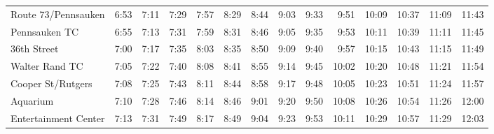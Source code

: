 \begin{center}
\begin{tabular}{@{}lrrrrrrrrrrrrr@{}}
Route 73/Pennsauken & 6:53 & 7:11 & 7:29 & 7:57 & 8:29 & 8:44 & 9:03 & 9:33 & 9:51 & 10:09 & 10:37 & 11:09 & 11:43 \\
Pennsauken TC & 6:55 & 7:13 & 7:31 & 7:59 & 8:31 & 8:46 & 9:05 & 9:35 & 9:53 & 10:11 & 10:39 & 11:11 & 11:45 \\
36th Street & 7:00 & 7:17 & 7:35 & 8:03 & 8:35 & 8:50 & 9:09 & 9:40 & 9:57 & 10:15 & 10:43 & 11:15 & 11:49 \\
Walter Rand TC & 7:05 & 7:22 & 7:40 & 8:08 & 8:41 & 8:55 & 9:14 & 9:45 & 10:02 & 10:20 & 10:48 & 11:21 & 11:54 \\
Cooper St/Rutgers & 7:08 & 7:25 & 7:43 & 8:11 & 8:44 & 8:58 & 9:17 & 9:48 & 10:05 & 10:23 & 10:51 & 11:24 & 11:57 \\
Aquarium & 7:10 & 7:28 & 7:46 & 8:14 & 8:46 & 9:01 & 9:20 & 9:50 & 10:08 & 10:26 & 10:54 & 11:26 & 12:00 \\
Entertainment Center & 7:13 & 7:31 & 7:49 & 8:17 & 8:49 & 9:04 & 9:23 & 9:53 & 10:11 & 10:29 & 10:57 & 11:29 & 12:03 \\
\bottomrule\end{tabular}\end{center}
